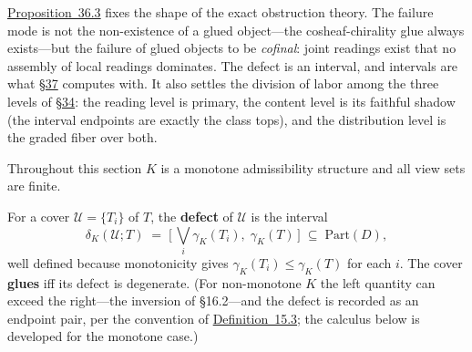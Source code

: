 \hyperlink{stmt:36.3}{Proposition~36.3} fixes the shape of the exact obstruction theory. The failure mode is not the non-existence of a glued object---\hspace{0pt}the cosheaf-chirality glue always exists---\hspace{0pt}but the failure of glued objects to be \emph{cofinal}: joint readings exist that no assembly of local readings dominates. The defect is an interval, and intervals are what \hyperlink{sec:37}{§37} computes with. It also settles the division of labor among the three levels of \hyperlink{sec:34}{§34}: the reading level is primary, the content level is its faithful shadow (the interval endpoints are exactly the class tops), and the distribution level is the graded fiber over both.


Throughout this section \(K\) is a monotone admissibility structure and all view sets are finite.


\begin{thmdef}

For a cover \(\mathcal{U} = \{T_i\}\) of \(T\), the \textbf{defect} of \(\mathcal{U}\) is the interval
\[
\delta_K(\mathcal{U}; T) \;=\; \Big[\, \bigvee_i \gamma_K(T_i),\; \gamma_K(T) \,\Big] \;\subseteq\; \mathrm{Part}(D),
\]
well defined because monotonicity gives \(\gamma_K(T_i) \le \gamma_K(T)\) for each \(i\). The cover \textbf{glues} iff its defect is degenerate. (For non-monotone \(K\) the left quantity can exceed the right---\hspace{0pt}the inversion of §16.2---\hspace{0pt}and the defect is recorded as an endpoint pair, per the convention of \hyperlink{stmt:15.3}{Definition~15.3}; the calculus below is developed for the monotone case.)
\end{thmdef}

